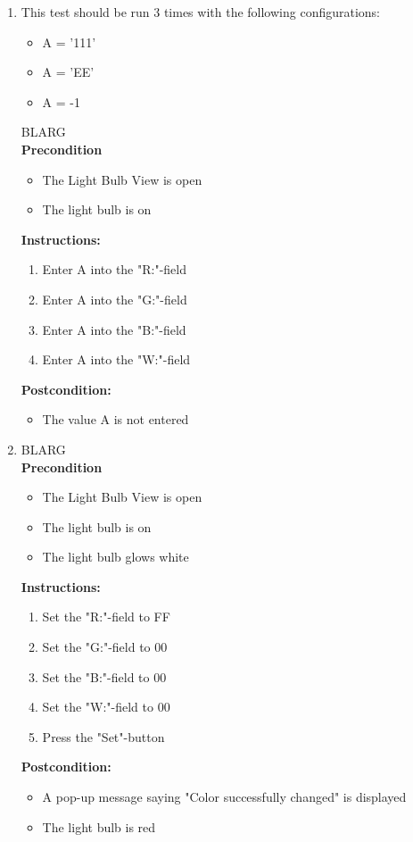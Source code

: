 \documentclass[a4paper]{article}
\newlength{\testlabellength}
\newenvironment{testlist}{\begin{enumerate}[label=\bfseries Instruction \thesubsection.\arabic* , labelindent=0pt, labelwidth=\testlabellength , leftmargin=2cm]}{\end{enumerate}}
\newenvironment{precondition}{
{\color{white}BLARG}\\ 
\textbf{Precondition}
\begin{itemize}[labelindent=0cm, labelwidth=2cm , leftmargin=1cm]
}
{\end{itemize}}
\newenvironment{instruction}{
\textbf{Instructions:}
\begin{enumerate}[label=\bfseries  \arabic*., labelindent=0cm, labelwidth=2cm , leftmargin=1cm]
}
{\end{enumerate}}
\newenvironment{postcondition}{
\textbf{Postcondition:}
\begin{itemize}[labelindent=0cm, labelwidth=2cm , leftmargin=1cm]
}
{\end{itemize}}
\begin{document}
\begin{appendices}
\begin{testlist}
	\item This test should be run 3 times with the following configurations:
		\begin{itemize}
			\item A = '111'
			\item A = 'EE'
			\item A = -1
		\end{itemize}
		\begin{precondition}
			\item The Light Bulb View is open
			\item The light bulb is on
		\end{precondition}
		\begin{instruction}
			\item Enter A into the "R:"-field
			\item Enter A into the "G:"-field
			\item Enter A into the "B:"-field
			\item Enter A into the "W:"-field
		\end{instruction}
		\begin{postcondition}
			\item The value A is not entered
		\end{postcondition}

	\item
		\begin{precondition}
			\item The Light Bulb View is open
			\item The light bulb is on
			\item The light bulb glows white
		\end{precondition}
		\begin{instruction}
			\item Set the "R:"-field to FF
			\item Set the "G:"-field to 00
			\item Set the "B:"-field to 00
			\item Set the "W:"-field to 00
			\item Press the "Set"-button
		\end{instruction}
		\begin{postcondition}
			\item A pop-up message saying "Color successfully changed" is displayed
			\item The light bulb is red
		\end{postcondition}


\end{testlist}
\end{appendices}
\end{document}
